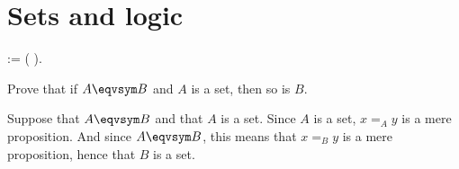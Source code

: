 \begin{coqdoccode}
\end{coqdoccode}
\section{Sets and logic}

\begin{coqdoccode}
\coqdocemptyline
\coqdocnoindent
{}   := (  ).\coqdoceol
\coqdocemptyline
\end{coqdoccode}
Prove that if $A \eqvsym B$ and $A$ is a set, then so is $B$.


 \soln
Suppose that $A \eqvsym B$ and that $A$ is a set.  Since $A$ is a set, $x =_{A}
y$ is a mere proposition.  And since $A \eqvsym B$, this means that $x =_{B} y$
is a mere proposition, hence that $B$ is a set.


